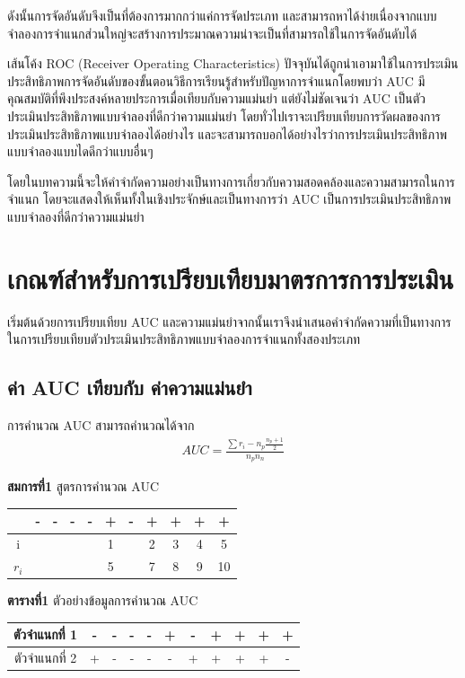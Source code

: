 \documentclass[twoside, twocolumn, 12pt]{article}
\begin{document}
ดังนั้นการจัดอันดับจึงเป็นที่ต้องการมากกว่าแค่การจัดประเภท และสามารถหาได้ง่ายเนื่องจากแบบจำลองการจำแนกส่วนใหญ่จะสร้างการประมาณความน่าจะเป็นที่สามารถใช้ในการจัดอันดับได้

เส้นโค้ง ROC (Receiver Operating Characteristics) ปัจจุบันได้ถูกนำเอามาใช้ในการประเมินประสิทธิภาพการจัดอันดับของขั้นตอนวิธีการเรียนรู้สำหรับปัญหาการจำแนกโดยพบว่า AUC มีคุณสมบัติที่พึงประสงค์หลายประการเมื่อเทียบกับความแม่นยำ แต่ยังไม่ชัดเจนว่า AUC เป็นตัวประเมินประสิทธิภาพแบบจำลองที่ดีกว่าความแม่นยำ โดยทั่วไปเราจะเปรียบเทียบการวัดผลของการประเมินประสิทธิภาพแบบจำลองได้อย่างไร และจะสามารถบอกได้อย่างไรว่าการประเมินประสิทธิภาพแบบจำลองแบบไดดีกว่าแบบอื่นๆ 

โดยในบทความนี้จะให้คำจำกัดความอย่างเป็นทางการเกี่ยวกับความสอดคล้องและความสามารถในการจำแนก โดยจะแสดงให้เห็นทั้งในเชิงประจักษ์และเป็นทางการว่า AUC เป็นการประเมินประสิทธิภาพแบบจำลองที่ดีกว่าความแม่นยำ


\section{เกณฑ์สำหรับการเปรียบเทียบมาตรการการประเมิน}
\quad เริ่มต้นด้วยการเปรียบเทียบ AUC และความแม่นยำจากนั้นเราจึงนำเสนอคำจำกัดความที่เป็นทางการในการเปรียบเทียบตัวประเมินประสิทธิภาพแบบจำลองการจำแนกทั้งสองประเภท
\subsection{ค่า AUC เทียบกับ ค่าความแม่นยำ}
\quad การคำนวณ AUC สามารถคำนวณได้จาก
\begin{gather*}
AUC = \frac{\sum r_i-n_p\frac{n_p + 1}{2}}{n_pn_n}
\end{gather*}

\begin{center} \textbf{สมการที่1} สูตรการคำนวณ AUC \end{center}
\begin{center}
\begin{tabular}{ccccccccccc}
  &-&-&-&-&+&-&+&+&+&+ \\
  \hline
  i&&&&&1&&2&3&4&5 \\
  $r_i$& & & & & 5&&7&8&9&10\\
  \hline  
\end{tabular}
\end{center}
\begin{center} \textbf{ตารางที่1} ตัวอย่างข้อมูลการคำนวณ AUC \end{center}
\begin{center}
\begin{tabular}{c|ccccc|ccccc}
  \hline
  ตัวจำแนกที่ 1 &-& -& -& -& +& -& +& +& +& +\\
  \hline
  ตัวจำแนกที่ 2 & +& -& -& -& -& +& +& +& +& -\\
  \hline  
\end{tabular}
\end{center}
\end{document}
